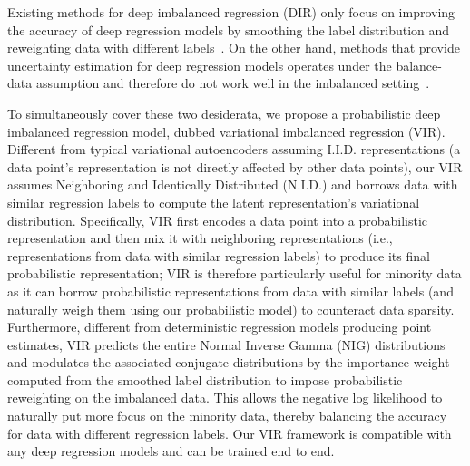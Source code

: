 Existing methods for deep imbalanced regression (DIR) only focus on improving the accuracy of deep regression models by smoothing the label distribution and reweighting data with different labels~\citep{MDLT,DIR}. On the other hand, methods that provide uncertainty estimation for deep regression models operates under the balance-data assumption and therefore do not work well in the {imbalanced setting~\citep{DER,natPN,TFuncertainty}.}

{
To simultaneously cover these two desiderata, we propose a probabilistic deep imbalanced regression model, dubbed variational imbalanced regression (VIR). 
Different from typical variational autoencoders assuming I.I.D. representations (a data point's representation is not directly affected by other data points), {our VIR assumes Neighboring and Identically Distributed (N.I.D.) and borrows data with similar regression labels to compute the latent representation's variational distribution.} Specifically, VIR first encodes a data point into a probabilistic representation and then mix it with neighboring representations (i.e., representations from data with similar regression labels) to produce its final probabilistic representation; 
VIR is therefore particularly useful for minority data as it can borrow probabilistic representations from data with similar labels (and naturally weigh them using our probabilistic model) to counteract data sparsity. 
Furthermore, different from deterministic regression models producing point estimates, VIR predicts the entire Normal Inverse Gamma (NIG) distributions and modulates the associated conjugate distributions by the importance weight computed from the smoothed label distribution to impose probabilistic reweighting on the imbalanced data. This allows the negative log likelihood to naturally put more focus on the minority data, thereby balancing the accuracy for data with different regression labels. Our VIR framework is compatible with any deep regression models and can be trained end to end.} 

